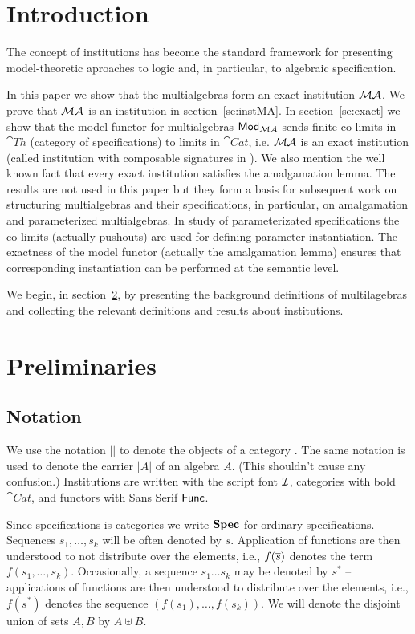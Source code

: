 
\section{Introduction}
The concept of institutions \cite{inst} has become the standard framework for presenting
model-theoretic aproaches to logic and, in particular, to algebraic
specification. 

In this paper we show that the multialgebras form an exact institution
${\mathcal{MA}}$.  We prove that ${\mathcal{MA}}$ is an institution in
section~\ref{se:instMA}.  In section~\ref{se:exact} we show that the model
functor for multialgebras ${\sf {Mod}}_{{\mathcal{MA}}}$ sends finite co-limits in
$\cat{Th}$ (category of specifications) to limits in $\cat{Cat}$,
i.e. ${\mathcal{MA}}$ is an exact institution \cite{statestruct} (called
institution with composable signatures in \cite{stateinst}). We also mention
the well known fact that every exact institution satisfies the amalgamation
lemma. The results are not used in this paper but they form a basis for
subsequent work on structuring multialgebras and their specifications, in
particular, on amalgamation and parameterized multialgebras. 
In study of
parameterizated specifications the co-limits (actually pushouts)
are used for defining parameter instantiation. The exactness of the model
functor (actually the amalgamation lemma) ensures that corresponding
instantiation can be performed at the semantic level.

We begin, in section~\ref{se:pre}, by presenting the background definitions of
multilagebras and collecting the relevant definitions and results about institutions.

\section{Preliminaries}\label{se:pre}

\subsection{Notation}
We use the notation $|${}$|$ to denote the objects of a category
. The same notation is used to denote the carrier $|A|$ of an algebra
$A$. (This shouldn't cause any confusion.)  Institutions are written with
the script font ${\mathcal{I}}$, categories with bold $\cat{Cat}$, and functors with
Sans Serif ${\sf {Func}}$.

Since specifications is categories we write ${\bf Spec}$ for ordinary specifications.
 Sequences $s_1, \ldots, s_k$ will be often denoted
by $\overline{s}$. Application of functions are then understood to not
distribute over the elements, i.e., $f(\overline{s})$ denotes the term
$f(s_1,\ldots, s_k)$.  
Occasionally, a sequence $s_1 \ldots s_k$ may be denoted by $s^*$ -- 
applications of functions are then understood to
distribute over the elements, i.e., $f(s^*)$ denotes the sequence
$(f(s_1),\ldots, f(s_k))$. We will denote the disjoint union of sets $A,B$ by $A \uplus B$.

